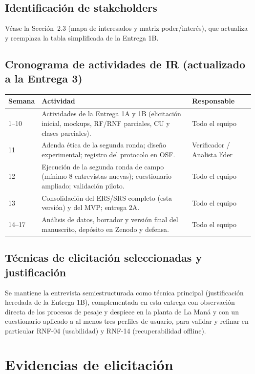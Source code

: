 \documentclass[11pt,a4paper]{article}
\begin{document}
\subsection{Identificación de stakeholders}
Véase la Sección~2.3 (mapa de interesados y matriz poder/interés), que actualiza y reemplaza la tabla simplificada de la Entrega 1B.

\subsection{Cronograma de actividades de IR (actualizado a la Entrega 3)}
\begin{longtable}{|p{1.6cm}|p{8.5cm}|p{3.5cm}|}
\hline
\textbf{Semana} & \textbf{Actividad} & \textbf{Responsable} \\
\hline
1--10 & Actividades de la Entrega 1A y 1B (elicitación inicial, mockups, RF/RNF parciales, CU y clases parciales). & Todo el equipo \\
\hline
11 & Adenda ética de la segunda ronda; diseño experimental; registro del protocolo en OSF. & Verificador / Analista líder \\
\hline
12 & Ejecución de la segunda ronda de campo (mínimo 8 entrevistas nuevas); cuestionario ampliado; validación piloto. & Todo el equipo \\
\hline
13 & Consolidación del ERS/SRS completo (esta versión) y del MVP; entrega 2A. & Todo el equipo \\
\hline
14--17 & Análisis de datos, borrador y versión final del manuscrito, depósito en Zenodo y defensa. & Todo el equipo \\
\hline
\end{longtable}

\subsection{Técnicas de elicitación seleccionadas y justificación}
Se mantiene la entrevista semiestructurada como técnica principal (justificación heredada de la Entrega 1B), complementada en esta entrega con observación directa de los procesos de pesaje y despiece en la planta de La Maná y con un cuestionario aplicado a al menos tres perfiles de usuario, para validar y refinar en particular RNF-04 (usabilidad) y RNF-14 (recuperabilidad offline).

\section{Evidencias de elicitación}
\end{document}
